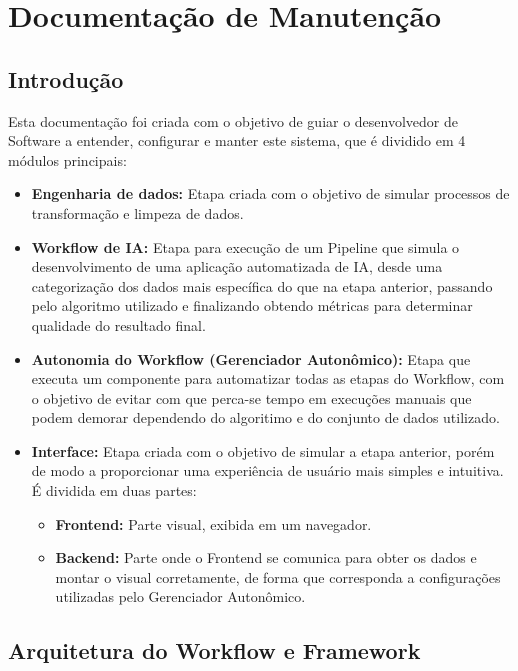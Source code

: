 \documentclass[portugues]{ic-tese}
\begin{document}
\chapter{Documentação de Manutenção}
\label{ann:DocMain}

\section{Introdução}

Esta documentação foi criada com o objetivo de guiar o desenvolvedor de Software a entender, configurar e manter este sistema, que é dividido em 4 módulos principais:

\begin{itemize}
    \item {\textbf{Engenharia de dados:}} Etapa criada com o objetivo de simular processos de transformação e limpeza de dados.
    \item {\textbf{Workflow de IA:}} Etapa para execução de um Pipeline que simula o desenvolvimento de uma aplicação automatizada de IA, desde uma categorização dos dados mais específica do que na etapa anterior, passando pelo algoritmo utilizado e finalizando obtendo métricas para determinar qualidade do resultado final.
    \item {\textbf{Autonomia do Workflow (Gerenciador Autonômico):}} Etapa que executa um componente para automatizar todas as etapas do Workflow, com o objetivo de evitar com que perca-se tempo em execuções manuais que podem demorar dependendo do algoritimo e do conjunto de dados utilizado.
    \item {\textbf{Interface:}} Etapa criada com o objetivo de simular a etapa anterior, porém de modo a proporcionar uma experiência de usuário mais simples e intuitiva. É dividida em duas partes:
    \begin{itemize}
        \item {\textbf{Frontend:}} Parte visual, exibida em um navegador.
        \item \textbf{{Backend:}} Parte onde o Frontend se comunica para obter os dados e montar o visual corretamente, de forma que corresponda a configurações utilizadas pelo Gerenciador Autonômico.
    \end{itemize}
\end{itemize}

\section{Arquitetura do Workflow e Framework}
\end{document}
